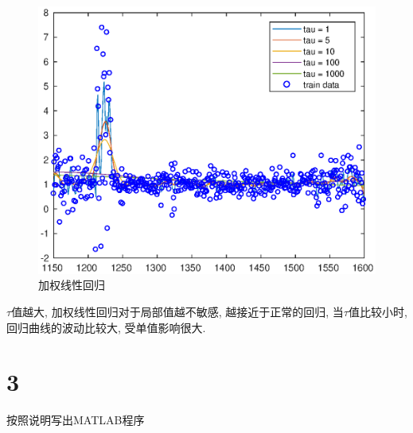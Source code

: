 \documentclass{ctexart}
\begin{document}
\begin{figure}[ht]
	\includegraphics[width = \textwidth]{weight_linear_regression.eps}
	\caption{加权线性回归}
	\label{logistic}
\end{figure}

$\tau$值越大, 加权线性回归对于局部值越不敏感, 越接近于正常的回归, 当$\tau$值比较小时, 回归曲线的波动比较大, 受单值影响很大.

\section{3}

按照说明写出MATLAB程序
\end{document}
